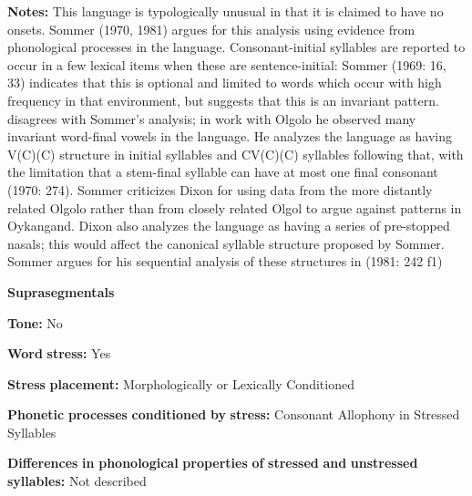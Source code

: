 \documentclass[output=paper]{langsci/langscibook}
\begin{document}
\begin{styleBody}
\textbf{Notes:} This language is typologically unusual in that it is claimed to have no onsets. Sommer (1970, 1981) argues for this analysis using evidence from phonological processes in the language. Consonant-initial syllables are reported to occur in a few lexical items when these are sentence-initial: Sommer (1969: 16, 33) indicates that this is optional and limited to words which occur with high frequency in that environment, but \citet{Sommer1981} suggests that this is an invariant pattern. \citet{Dixon1970} disagrees with Sommer’s analysis; in work with Olgolo he observed many invariant word-final vowels in the language. He analyzes the language as having V(C)(C) structure in initial syllables and CV(C)(C) syllables following that, with the limitation that a stem-final syllable can have at most one final consonant (1970: 274). Sommer criticizes Dixon for using data from the more distantly related Olgolo rather than from closely related Olgol to argue against patterns in Oykangand. Dixon also analyzes the language as having a series of pre-stopped nasals; this would affect the canonical syllable structure proposed by Sommer. Sommer argues for his sequential analysis of these structures in (1981: 242 f1)
\end{styleBody}

\begin{styleBody}
\textbf{Suprasegmentals}
\end{styleBody}

\begin{styleBody}
\textbf{Tone:} No
\end{styleBody}

\begin{styleBody}
\textbf{Word} \textbf{stress:} Yes
\end{styleBody}

\begin{styleBody}
\textbf{Stress} \textbf{placement:} Morphologically or Lexically Conditioned
\end{styleBody}

\begin{styleBody}
\textbf{Phonetic} \textbf{processes} \textbf{conditioned} \textbf{by} \textbf{stress:} Consonant Allophony in Stressed Syllables
\end{styleBody}

\begin{styleBody}
\textbf{Differences} \textbf{in} \textbf{phonological} \textbf{properties} \textbf{of} \textbf{stressed} \textbf{and} \textbf{unstressed} \textbf{syllables:} Not described
\end{styleBody}
\end{document}
